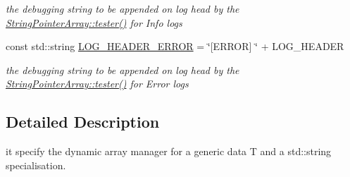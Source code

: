 \begin{DoxyCompactItemize}
\begin{DoxyCompactList}\small\item\em the debugging string to be appended on log head by the \hyperlink{classparray_1_1StringPointerArray_abfac13570bec8c88311714d19ddea59b}{String\-Pointer\-Array\-::tester()} for Info logs \end{DoxyCompactList}\item 
\hypertarget{namespaceparray_a6cd699f2dd9c98d7f9ac98fb178a8a4f}{const std\-::string \hyperlink{namespaceparray_a6cd699f2dd9c98d7f9ac98fb178a8a4f}{L\-O\-G\-\_\-\-H\-E\-A\-D\-E\-R\-\_\-\-E\-R\-R\-O\-R} = \char`\"{}\mbox{[}E\-R\-R\-O\-R\mbox{]} \char`\"{} + L\-O\-G\-\_\-\-H\-E\-A\-D\-E\-R}\label{namespaceparray_a6cd699f2dd9c98d7f9ac98fb178a8a4f}

\begin{DoxyCompactList}\small\item\em the debugging string to be appended on log head by the \hyperlink{classparray_1_1StringPointerArray_abfac13570bec8c88311714d19ddea59b}{String\-Pointer\-Array\-::tester()} for Error logs \end{DoxyCompactList}\end{DoxyCompactItemize}


\subsection{Detailed Description}
it specify the dynamic array manager for a generic data T and a std\-::string specialisation. 